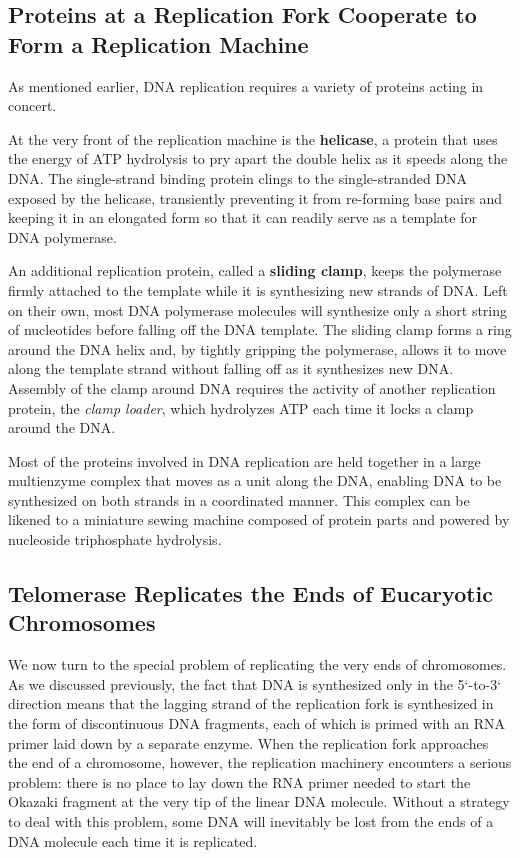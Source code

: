 \subsection{Proteins at a Replication Fork Cooperate to Form a Replication Machine}

As mentioned earlier, DNA replication requires a variety of proteins acting in concert.

At the very front of the replication
machine is the \textbf{helicase}, a protein that uses the energy of ATP hydrolysis
to pry apart the double helix as it speeds along the DNA.
The single-strand binding protein clings to the single-stranded
DNA exposed by the helicase, transiently preventing it from re-forming
base pairs and keeping it in an elongated form so that it can readily serve
as a template for DNA polymerase.

An additional replication protein, called a \textbf{sliding clamp}, keeps the
polymerase firmly attached to the template while it is synthesizing new
strands of DNA. Left on their own, most DNA polymerase molecules will
synthesize only a short string of nucleotides before falling off the DNA
template. The sliding clamp forms a ring around the DNA helix and, by
tightly gripping the polymerase, allows it to move along the template
strand without falling off as it synthesizes new DNA.
Assembly of the clamp around DNA requires the activity of another
replication protein, the \textit{clamp loader}, which hydrolyzes
ATP each time it locks a clamp around the DNA.

Most of the proteins involved in DNA replication are held together in a
large multienzyme complex that moves as a unit along the DNA, enabling
DNA to be synthesized on both strands in a coordinated manner.
This complex can be likened to a miniature sewing machine composed of
protein parts and powered by nucleoside triphosphate hydrolysis.

\subsection{Telomerase Replicates the Ends of Eucaryotic Chromosomes}

We now turn to the special problem of replicating the very ends of chromosomes. As we discussed previously,
the fact that DNA is synthesized only in the 5`-to-3` direction means that
the lagging strand of the replication fork is synthesized in the form of discontinuous
DNA fragments, each of which is primed with an RNA primer laid down by a separate enzyme.
When the replication fork approaches the end of a chromosome, however, the replication
machinery encounters a serious problem: there is no place to lay down
the RNA primer needed to start the Okazaki fragment at the very tip of
the linear DNA molecule. Without a strategy to deal with this problem,
some DNA will inevitably be lost from the ends of a DNA molecule each
time it is replicated.

